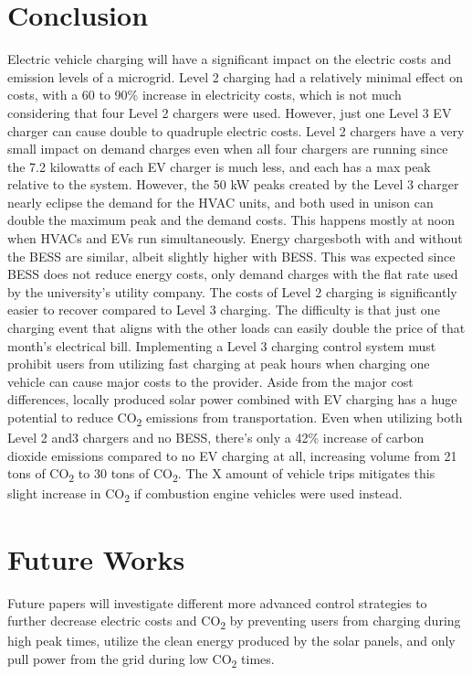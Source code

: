 \documentclass[conference]{IEEEtran}
\begin{document}
	
	


	
	\section{Conclusion}

		Electric vehicle charging will have a significant impact on the electric costs and emission levels of a microgrid. Level 2 charging had a relatively minimal effect on costs, with a 60 to 90\% increase in electricity costs, which is not much considering that four Level 2 chargers were used. However, just one Level 3 EV charger can cause double to quadruple electric costs. Level 2 chargers have a very small impact on demand charges even when all four chargers are running since the 7.2 kilowatts of each EV charger is much less, and each has a max peak relative to the system. However, the 50 kW peaks created by the Level 3 charger nearly eclipse the demand for the HVAC units, and both  used in unison can double the maximum peak and the demand costs. This happens mostly at noon when HVACs and EVs run simultaneously. Energy chargesboth with and without the BESS are similar, albeit slightly higher with BESS. This was expected since BESS does not reduce energy costs, only demand charges with the flat rate used by the university’s utility company. The costs of Level 2 charging is significantly easier to recover compared to Level 3 charging. The difficulty is that just one charging event that aligns with the other loads can easily double the price of that month’s electrical bill. Implementing a Level 3 charging control system must prohibit users from utilizing fast charging at peak hours when charging one vehicle can cause major costs to the provider. Aside from the major cost differences, locally produced solar power combined with EV charging has a huge potential to reduce CO\textsubscript{2} emissions from transportation. Even when utilizing both Level 2 and3 chargers and no BESS, there’s only a 42\% increase of carbon dioxide emissions compared to no EV charging at all, increasing volume from 21 tons of CO\textsubscript{2} to 30 tons of CO\textsubscript{2}. The X amount of vehicle trips mitigates this slight increase in CO\textsubscript{2} if combustion engine vehicles were used instead. 
	\section{Future Works}
	    Future papers will investigate different more advanced control strategies to further decrease electric costs and CO\textsubscript{2} by preventing users from charging during high peak times, utilize the clean energy produced by the solar panels, and only pull power from the grid during low CO\textsubscript{2} times.
		
		
		
\end{document}
